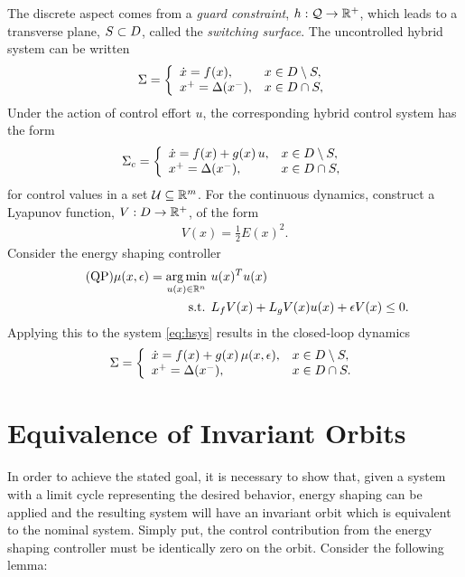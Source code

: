 \documentclass[twocolumn]{article}
\begin{document}
The discrete aspect comes from a {\em guard constraint}, $h : \mathcal{Q} \to \mathbb{R}^{+}$, which leads to a transverse plane, $S \subset D$, called the {\em switching surface}.
%
The uncontrolled hybrid system can be written
\begin{align}
  \Sigma = \left\{
  \begin{array}{l l}
    {\dot x} = f(x), & x \in D \setminus S,\\
    x^{+} = \Delta(x^{-}), &x \in D \cap S,
  \end{array}\right.
  \label{eq:hsys}
\end{align}
Under the action of control effort $u$, the corresponding hybrid control system has the form
\begin{align}
  \Sigma_{c} = \left\{
  \begin{array}{l l}
    {\dot x} = f(x) + g(x) \, u, & x \in D \setminus S,\\
    x^{+} = \Delta(x^{-}), &x \in D \cap S,
  \end{array}\right.
  \label{eq:csys}
\end{align}
for control values in a set $\mathcal{U} \subseteq \mathbb{R}^{m}$.
%
For the continuous dynamics, construct a Lyapunov function, $V : D \to \mathbb{R}^{+}$, of the form
\begin{align}
  \label{eq:lyap}
  V(x) = \frac{1}{2} E(x)^2.
\end{align}
Consider the energy shaping controller
\begin{align}
  \label{eq:es-qp} \tag {QP}
  \mu(x, \epsilon) = \operatorname*{arg\,min}_{u(x) \in \mathbb{R}^{n}} \ & u(x)^T u(x)\\
  \nonumber
  \mbox{s.t. } & L_{f} V(x) + L_{g} V(x) u(x) + \epsilon V(x) \leq 0.
\end{align}
Applying this to the system \eqref{eq:hsys} results in the closed-loop dynamics
\begin{align}
  \label{eq:hsys-cl}
  \Sigma = \left\{
  \begin{array}{l l}
    {\dot x} = f(x) + g(x) \, \mu(x, \epsilon), & x \in D \setminus S,\\
    x^{+} = \Delta(x^{-}), &x \in D \cap S.
  \end{array}\right.
\end{align}

\section{Equivalence of Invariant Orbits}
In order to achieve the stated goal, it is necessary to show that, given a system with a limit cycle representing the desired behavior, energy shaping can be applied and the resulting system will have an invariant orbit which is equivalent to the nominal system. Simply put, the control contribution from the energy shaping controller must be identically zero on the orbit. Consider the following lemma:
\end{document}
